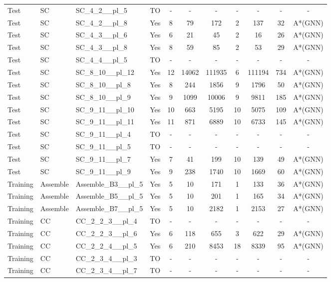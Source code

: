 \documentclass{article}
\begin{document}
\begin{tabular}{lllcccccccc}
Test & SC & SC\_4\_2\_\_pl\_5 & TO & - & - & - & - & - & - & - \\
Test & SC & SC\_4\_2\_\_pl\_8 & Yes & 8 & 79 & 172 & 2 & 137 & 32 & A*(GNN) \\
Test & SC & SC\_4\_3\_\_pl\_6 & Yes & 6 & 21 & 45 & 2 & 16 & 26 & A*(GNN) \\
Test & SC & SC\_4\_3\_\_pl\_8 & Yes & 8 & 59 & 85 & 2 & 53 & 29 & A*(GNN) \\
Test & SC & SC\_4\_4\_\_pl\_5 & TO & - & - & - & - & - & - & - \\
Test & SC & SC\_8\_10\_\_pl\_12 & Yes & 12 & 14062 & 111935 & 6 & 111194 & 734 & A*(GNN) \\
Test & SC & SC\_8\_10\_\_pl\_8 & Yes & 8 & 244 & 1856 & 9 & 1796 & 50 & A*(GNN) \\
Test & SC & SC\_8\_10\_\_pl\_9 & Yes & 9 & 1099 & 10006 & 9 & 9811 & 185 & A*(GNN) \\
Test & SC & SC\_9\_11\_\_pl\_10 & Yes & 10 & 663 & 5195 & 10 & 5075 & 109 & A*(GNN) \\
Test & SC & SC\_9\_11\_\_pl\_11 & Yes & 11 & 871 & 6889 & 10 & 6733 & 145 & A*(GNN) \\
Test & SC & SC\_9\_11\_\_pl\_4 & TO & - & - & - & - & - & - & - \\
Test & SC & SC\_9\_11\_\_pl\_5 & TO & - & - & - & - & - & - & - \\
Test & SC & SC\_9\_11\_\_pl\_7 & Yes & 7 & 41 & 199 & 10 & 139 & 49 & A*(GNN) \\
Test & SC & SC\_9\_11\_\_pl\_9 & Yes & 9 & 238 & 1740 & 10 & 1669 & 60 & A*(GNN) \\
Training & Assemble & Assemble\_B3\_\_pl\_5 & Yes & 5 & 10 & 171 & 1 & 133 & 36 & A*(GNN) \\
Training & Assemble & Assemble\_B5\_\_pl\_5 & Yes & 5 & 10 & 201 & 1 & 165 & 34 & A*(GNN) \\
Training & Assemble & Assemble\_B7\_\_pl\_5 & Yes & 5 & 10 & 2182 & 1 & 2153 & 27 & A*(GNN) \\
Training & CC & CC\_2\_2\_3\_\_pl\_4 & TO & - & - & - & - & - & - & - \\
Training & CC & CC\_2\_2\_3\_\_pl\_6 & Yes & 6 & 118 & 655 & 3 & 622 & 29 & A*(GNN) \\
Training & CC & CC\_2\_2\_4\_\_pl\_5 & Yes & 6 & 210 & 8453 & 18 & 8339 & 95 & A*(GNN) \\
Training & CC & CC\_2\_3\_4\_\_pl\_3 & TO & - & - & - & - & - & - & - \\
Training & CC & CC\_2\_3\_4\_\_pl\_7 & TO & - & - & - & - & - & - & - \\

\end{tabular}
\end{document}
